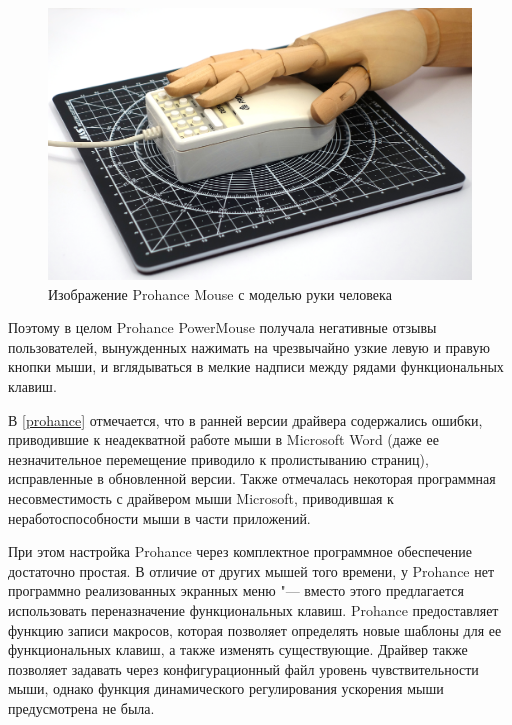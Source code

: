 \documentclass[11pt, a4paper]{article}
\begin{document}
\begin{figure}[h]
    \centering
    \includegraphics[scale=0.4]{1989_prohance_powermouse/hand_30.jpg}
    \caption{Изображение Prohance Mouse с моделью руки человека}
    \label{fig:ProhanceHand}
\end{figure}

Поэтому в целом Prohance PowerMouse получала негативные отзывы пользователей, вынужденных нажимать на чрезвычайно узкие левую и правую кнопки мыши, и вглядываться в мелкие надписи между рядами функциональных клавиш.

В \ref{prohance} отмечается, что в ранней версии драйвера содержались ошибки, приводившие к неадекватной работе мыши в Microsoft Word (даже ее незначительное перемещение приводило к пролистыванию страниц), исправленные в обновленной версии. Также отмечалась некоторая программная несовместимость с драйвером мыши Microsoft, приводившая к неработоспособности мыши в части приложений.

При этом настройка Prohance через комплектное программное обеспечение достаточно простая. В отличие от других мышей того времени, у Prohance нет программно реализованных экранных меню "--- вместо этого предлагается использовать переназначение функциональных клавиш. Prohance предоставляет функцию записи макросов, которая позволяет определять новые шаблоны для ее функциональных клавиш, а также изменять существующие.
Драйвер также позволяет задавать через конфигурационный файл уровень чувствительности мыши, однако функция динамического регулирования ускорения мыши предусмотрена не была.
\end{document}
